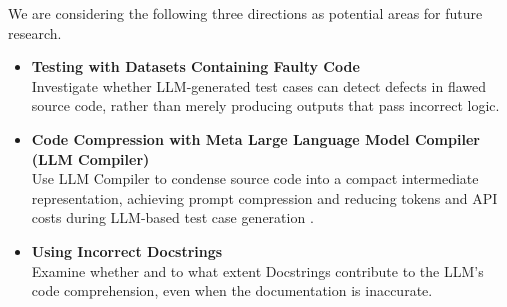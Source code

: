 We are considering the following three directions as potential areas for future research.

\begin{itemize}[label={$\bullet$}]
    \item \textbf{Testing with Datasets Containing Faulty Code} \\Investigate whether LLM-generated test cases can detect defects in flawed source code, rather than merely producing outputs that pass incorrect logic.
    \vspace{0.3cm}
    
    \item \textbf{Code Compression with Meta Large Language Model Compiler (LLM Compiler)} \\Use LLM Compiler to condense source code into a compact intermediate representation, achieving prompt compression and reducing tokens and API costs during LLM-based test case generation \cite{cummins2024metalargelanguagemodel}.
    \vspace{0.3cm}

    \item \textbf{Using Incorrect Docstrings} \\Examine whether and to what extent Docstrings contribute to the LLM’s code comprehension, even when the documentation is inaccurate.
\end{itemize}
